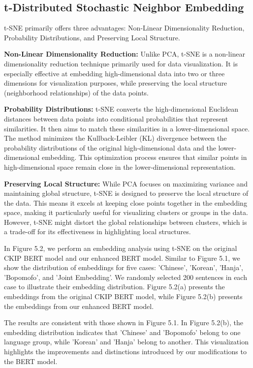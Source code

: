 \documentclass[PhD]{PHlab-thesis}
\begin{document}
\subsection{t-Distributed Stochastic Neighbor Embedding}
t-SNE primarily offers three advantages: Non-Linear Dimensionality Reduction, Probability Distributions, and Preserving Local Structure.

\textbf{Non-Linear Dimensionality Reduction:} Unlike PCA, t-SNE is a non-linear dimensionality reduction technique primarily used for data visualization. It is especially effective at embedding high-dimensional data into two or three dimensions for visualization purposes, while preserving the local structure (neighborhood relationships) of the data points.

\textbf{Probability Distributions:} t-SNE converts the high-dimensional Euclidean distances between data points into conditional probabilities that represent similarities. It then aims to match these similarities in a lower-dimensional space. The method minimizes the Kullback-Leibler (KL) divergence between the probability distributions of the original high-dimensional data and the lower-dimensional embedding. This optimization process ensures that similar points in high-dimensional space remain close in the lower-dimensional representation.

\textbf{Preserving Local Structure:} While PCA focuses on maximizing variance and maintaining global structure, t-SNE is designed to preserve the local structure of the data. This means it excels at keeping close points together in the embedding space, making it particularly useful for visualizing clusters or groups in the data. However, t-SNE might distort the global relationships between clusters, which is a trade-off for its effectiveness in highlighting local structures.

In Figure 5.2, we perform an embedding analysis using t-SNE on the original CKIP BERT model and our enhanced BERT model. Similar to Figure 5.1, we show the distribution of embeddings for five cases: 'Chinese', 'Korean', 'Hanja', 'Bopomofo', and 'Joint Embedding'. We randomly selected 200 sentences in each case to illustrate their embedding distribution. Figure 5.2(a) presents the embeddings from the original CKIP BERT model, while Figure 5.2(b) presents the embeddings from our enhanced BERT model.

The results are consistent with those shown in Figure 5.1. In Figure 5.2(b), the embedding distribution indicates that 'Chinese' and 'Bopomofo' belong to one language group, while 'Korean' and 'Hanja' belong to another. This visualization highlights the improvements and distinctions introduced by our modifications to the BERT model.
\end{document}
